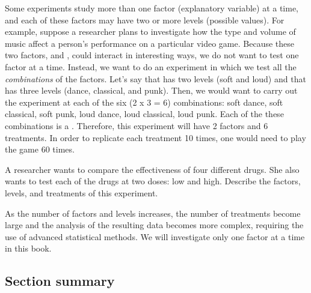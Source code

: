 
Some experiments study more than one factor (explanatory variable) at a time, and each of these factors may have two or more levels (possible values). For example, suppose a researcher plans to investigate how the type and volume of music affect a person's performance on a particular video game. Because these two factors,  and , could interact in interesting ways, we do not want to test one factor at a time. %
Instead, we want to do an experiment in which
we test all the \emph{combinations} of the factors. Let's say that  has two levels (soft and loud) and that  has three levels (dance, classical, and punk). Then, we would want to carry out the experiment at each of the six (2 x 3 = 6) combinations: soft dance, soft classical, soft punk, loud dance, loud classical, loud punk. Each of the these combinations is a . Therefore, this experiment will have 2 factors and 6 treatments. In order to replicate each treatment 10 times, one would need to play the game 60 times.

\begin{exercisewrap}
\begin{nexercise}A researcher wants to compare the effectiveness of four different drugs. She also wants to test each of the drugs at two doses: low and high. Describe the factors, levels, and treatments of this experiment.\footnotemark
\end{nexercise}
\end{exercisewrap}

As the number of factors and levels increases, the number of treatments become large and the analysis of the resulting data becomes more complex, requiring the use of advanced statistical methods. We will investigate only one factor at a time in this book.


\subsection*{Section summary}

